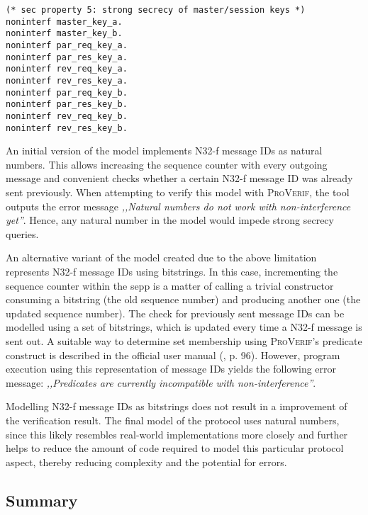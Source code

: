 \begin{lstlisting}[caption={Query for security property 5},label={lst:query-sec-5},firstnumber=419]
(* sec property 5: strong secrecy of master/session keys *)
noninterf master_key_a.
noninterf master_key_b.
noninterf par_req_key_a.
noninterf par_res_key_a.
noninterf rev_req_key_a.
noninterf rev_res_key_a.
noninterf par_req_key_b.
noninterf par_res_key_b.
noninterf rev_req_key_b.
noninterf rev_res_key_b.
\end{lstlisting}

An initial version of the model implements N32-f message IDs as natural numbers.
This allows increasing the sequence counter with every outgoing message and convenient checks whether a certain N32-f message ID was already sent previously.
When attempting to verify this model with \textsc{ProVerif}, the tool outputs the error message \textit{,,Natural numbers do not work with non-interference yet''}.
Hence, any natural number in the model would impede strong secrecy queries.

An alternative variant of the model created due to the above limitation represents N32-f message IDs using bitstrings.
In this case, incrementing the sequence counter within the \gls{sepp} is a matter of calling a trivial constructor consuming a bitstring (the old sequence number) and producing another one (the updated sequence number).
The check for previously sent message IDs can be modelled using a set of bitstrings, which is updated every time a N32-f message is sent out.
A suitable way to determine set membership using \textsc{ProVerif}'s {\sffamily predicate} construct is described in the official user manual (\cite{blanchet2020proverif}, p. 96).
However, program execution using this representation of message IDs yields the following error message: \textit{,,Predicates are currently incompatible with non-interference''}.

Modelling N32-f message IDs as bitstrings does not result in a improvement of the verification result.
The final model of the protocol uses natural numbers, since this likely resembles real-world implementations more closely and further helps to reduce the amount of code required to model this particular protocol aspect, thereby reducing complexity and the potential for errors.

\subsection{Summary}
\label{ssec:verif-summary}

